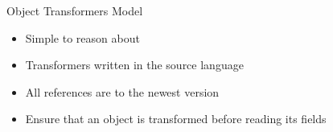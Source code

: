 \begin{frame}{Object Transformers Model}%
\begin{itemize}
\item Simple to reason about
\item Transformers written in the source language
\item All references are to the newest version
\item Ensure that an object is transformed before reading its fields
\end{itemize}
\end{frame}
